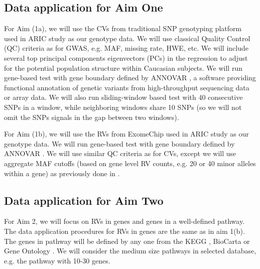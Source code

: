 \documentclass[12pt]{article}
\begin{document}
\subsection{Data application for Aim One}
\label{sec:Data Application-aim1}
For Aim (1a), we will use the CVs from traditional SNP genotyping platform used in ARIC study as our genotype data. We will use classical Quality Control (QC) criteria as for GWAS, e.g. MAF, missing rate, HWE, etc. We will include several top principal components eigenvectors (PCs) in the regression to adjust for the potential population structure within Caucasian subjects. We will run gene-based test with gene boundary defined by ANNOVAR \cite{Wang2010a}, a software providing functional annotation of genetic variants from high-throughput sequencing data or array data.  We will also run sliding-window based test with 40 consecutive SNPs in a window, while neighboring windows share 10 SNPs (so we will not omit the SNPs signals in the gap between two windows). 

For Aim (1b), we will use the RVs from ExomeChip used in ARIC study as our genotype data. We will run gene-based test with gene boundary defined by ANNOVAR \cite{Wang2010a}. We will use similar QC criteria as for CVs, except we will use aggregate MAF cutoffs (based on gene level RV counts, e.g. 20 or 40 minor alleles within a gene) as previously done in \cite{Lange2014,Peloso2014}. 

\subsection{Data application for Aim Two}
\label{sec:Data Application-aim2}
For Aim 2, we will focus on RVs in genes and genes in a well-defined pathway. The data application procedures for RVs in genes are the same as in aim 1(b). The genes in pathway will be defined by any one from the KEGG \cite{Ogata1999}, BioCarta \cite{Nishimura2001} or Gene Ontology \cite{Ashburner2000}. We will consider the medium size pathways in selected database, e.g. the pathway with 10-30 genes.



\end{document}
